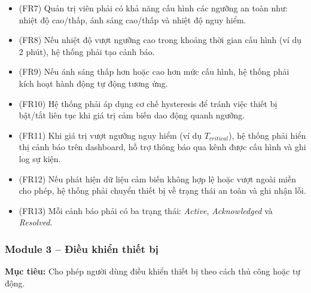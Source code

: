 \begin{itemize}
    \item (FR7) Quản trị viên phải có khả năng cấu hình các ngưỡng an toàn như: nhiệt độ cao/thấp, ánh sáng cao/thấp và nhiệt độ nguy hiểm.
    
    \item (FR8) Nếu nhiệt độ vượt ngưỡng cao trong khoảng thời gian cấu hình (ví dụ 2 phút), hệ thống phải tạo cảnh báo.
    
    \item (FR9) Nếu ánh sáng thấp hơn hoặc cao hơn mức cấu hình, hệ thống phải kích hoạt hành động tự động tương ứng.
    
    \item (FR10) Hệ thống phải áp dụng cơ chế hysteresis để tránh việc thiết bị bật/tắt liên tục khi giá trị cảm biến dao động quanh ngưỡng.
    
    \item (FR11) Khi giá trị vượt ngưỡng nguy hiểm (ví dụ $T_{critical}$), hệ thống phải hiển thị cảnh báo trên dashboard, hỗ trợ thông báo qua kênh được cấu hình và ghi log sự kiện.
    
    \item (FR12) Nếu phát hiện dữ liệu cảm biến không hợp lệ hoặc vượt ngoài miền cho phép, hệ thống phải chuyển thiết bị về trạng thái an toàn và ghi nhận lỗi.
    
    \item (FR13) Mỗi cảnh báo phải có ba trạng thái: \textit{Active}, \textit{Acknowledged} và \textit{Resolved}.
\end{itemize}

\subsubsection{Module 3 – Điều khiển thiết bị}

\textbf{Mục tiêu:} Cho phép người dùng điều khiển thiết bị theo cách thủ công hoặc tự động.

